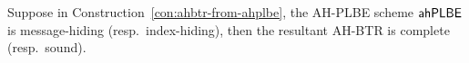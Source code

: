 \begin{theorem}\label{thm:ahbtr-from-ahplbe}
Suppose in Construction~\ref{con:ahbtr-from-ahplbe},
the AH-PLBE scheme $\AHPLBE$ is message-hiding (resp.~index-hiding),
then the resultant AH-BTR is complete (resp.~sound).
\end{theorem}
